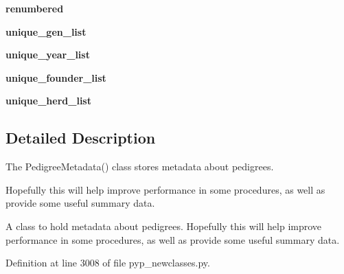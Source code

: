 \begin{DoxyCompactItemize}
\item 
\hypertarget{classPyPedal_1_1pyp__newclasses_1_1PedigreeMetadata_a438e394237da437693a667f01bf17500}{
{\bfseries renumbered}}
\label{classPyPedal_1_1pyp__newclasses_1_1PedigreeMetadata_a438e394237da437693a667f01bf17500}

\item 
\hypertarget{classPyPedal_1_1pyp__newclasses_1_1PedigreeMetadata_a12189226c48c79f6256be356927595b6}{
{\bfseries unique\_\-gen\_\-list}}
\label{classPyPedal_1_1pyp__newclasses_1_1PedigreeMetadata_a12189226c48c79f6256be356927595b6}

\item 
\hypertarget{classPyPedal_1_1pyp__newclasses_1_1PedigreeMetadata_a9006f241d87025dc5035be307d2173ab}{
{\bfseries unique\_\-year\_\-list}}
\label{classPyPedal_1_1pyp__newclasses_1_1PedigreeMetadata_a9006f241d87025dc5035be307d2173ab}

\item 
\hypertarget{classPyPedal_1_1pyp__newclasses_1_1PedigreeMetadata_a8d1484c36529a6a2dc85e1562540d4dc}{
{\bfseries unique\_\-founder\_\-list}}
\label{classPyPedal_1_1pyp__newclasses_1_1PedigreeMetadata_a8d1484c36529a6a2dc85e1562540d4dc}

\item 
\hypertarget{classPyPedal_1_1pyp__newclasses_1_1PedigreeMetadata_a91b610d629df6c79f8adc7605af72541}{
{\bfseries unique\_\-herd\_\-list}}
\label{classPyPedal_1_1pyp__newclasses_1_1PedigreeMetadata_a91b610d629df6c79f8adc7605af72541}

\end{DoxyCompactItemize}


\subsection{Detailed Description}
The PedigreeMetadata() class stores metadata about pedigrees. 

Hopefully this will help improve performance in some procedures, as well as provide some useful summary data. \begin{DoxyVerb}A class to hold metadata about pedigrees.  Hopefully this will help improve performance in some procedures, as well as
provide some useful summary data.\end{DoxyVerb}
 

Definition at line 3008 of file pyp\_\-newclasses.py.



